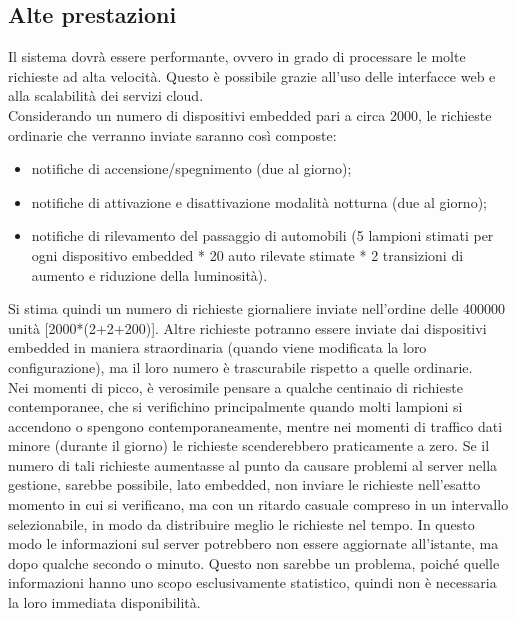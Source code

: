 \subsection{Alte prestazioni}
Il sistema dovrà essere performante, ovvero in grado di processare le molte richieste ad alta velocità.
Questo è possibile grazie all'uso delle interfacce web e alla scalabilità dei servizi cloud.
\\Considerando un numero di dispositivi embedded pari a circa 2000, le richieste ordinarie che verranno inviate saranno così composte:
\begin{itemize}
 \item notifiche di accensione/spegnimento (due al giorno);
 \item notifiche di attivazione e disattivazione modalità notturna (due al giorno);
 \item notifiche di rilevamento del passaggio di automobili (5 lampioni stimati per ogni dispositivo embedded * 20 auto rilevate stimate * 2 transizioni di aumento e riduzione della luminosità).
\end{itemize}
Si stima quindi un numero di richieste giornaliere inviate nell'ordine delle 400000 unità [2000*(2+2+200)].
Altre richieste potranno essere inviate dai dispositivi embedded in maniera straordinaria (quando viene modificata la loro configurazione), ma il loro numero è trascurabile rispetto a quelle ordinarie.
\\Nei momenti di picco, è verosimile pensare a qualche centinaio di richieste contemporanee, che si verifichino principalmente quando molti lampioni si accendono o spengono contemporaneamente, mentre nei momenti di traffico dati minore (durante il giorno) le richieste scenderebbero praticamente a zero.
Se il numero di tali richieste aumentasse al punto da causare problemi al server nella gestione, sarebbe possibile, lato embedded, non inviare le richieste nell'esatto momento in cui si verificano, ma con un ritardo casuale compreso in un intervallo selezionabile, in modo da distribuire meglio le richieste nel tempo.
In questo modo le informazioni sul server potrebbero non essere aggiornate all’istante, ma dopo qualche secondo o minuto.
Questo non sarebbe un problema, poiché quelle informazioni hanno uno scopo esclusivamente statistico, quindi non è necessaria la loro immediata disponibilità.

